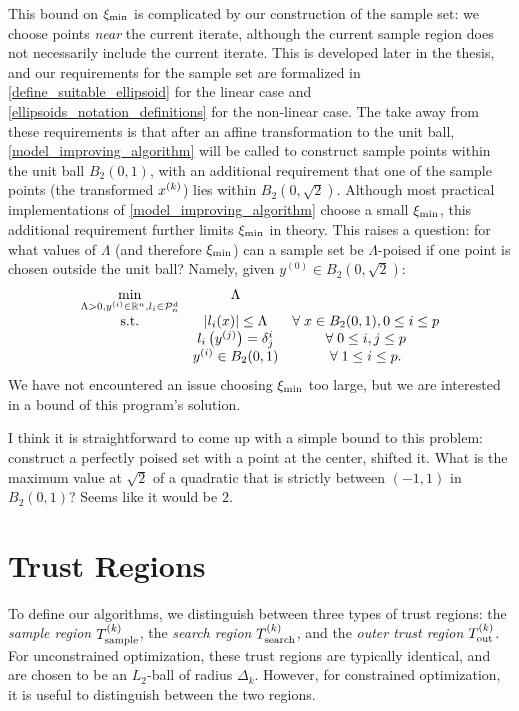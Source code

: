 This bound on $\xi_{\text{min}}$ is complicated by our construction of the sample set:
we choose points {\em near} the current iterate, although the current sample region does not necessarily include the current iterate.
This is developed later in the thesis, and our requirements for the sample set are formalized in \cref{define_suitable_ellipsoid} for the linear case and \cref{ellipsoids_notation_definitions} for the non-linear case.
The take away from these requirements is that after an affine transformation to the unit ball, \cref{model_improving_algorithm} 
will be called to construct sample points within the unit ball $B_2(0, 1)$, with an additional requirement that one of the sample points (the transformed $x^{(k)}$)
 lies within $B_2\left(0, \sqrt{2}\right)$.
Although most practical implementations of \cref{model_improving_algorithm} choose a small $\xi_{\text{min}}$, 
this additional requirement further limits $\xi_{\text{min}}$ in theory.
This raises a question:
for what values of $\Lambda$ (and therefore $\xi_{\text{min}}$) can a sample set be $\Lambda$-poised if one point is chosen outside the unit ball?
Namely, given $y^{(0)} \in B_2\left(0, \sqrt{2}\right)$:
\begin{align*}
\begin{array}{ccc}
\min\limits_{\Lambda>0, y^{(i)}\in\mathbb R^n, l_i\in\mathcal{P}^d_n} & \Lambda & \\
\textrm{s.t.} & |l_i(x)| \le \Lambda & \forall \; x \in B_2(0, 1), 0 \le i \le p \\
& l_i\left(y^{(j)}\right) = \delta^i_j & \forall \; 0 \le i,j \le p \\
& y^{(i)} \in B_2(0, 1) & \forall \; 1 \le i \le p.
\end{array}
\end{align*}
We have not encountered an issue choosing $\xi_{\text{min}}$ too large,
but we are interested in a bound of this program's solution.

\begin{boxedcomment}
I think it is straightforward to come up with a simple bound to this problem:
construct a perfectly poised set with a point at the center, shifted it.
What is the maximum value at $\sqrt 2$ of a quadratic that is strictly between $(-1, 1)$ in $B_2(0, 1)$?
Seems like it would be $2$.
\end{boxedcomment}

\section{Trust Regions}

To define our algorithms, we distinguish between three types of trust regions: 
the {\em sample region} ${T_{\text{sample}}^{(k)}}$,
the {\em search region} ${T_{\text{search}}^{(k)}}$,
and the {\em outer trust region} ${T_{\text{out}}^{(k)}}$.
For unconstrained optimization,  these trust regions are typically identical,  and are chosen to be an $L_2$-ball of radius $\Delta_k$.
However, for constrained optimization, it is useful to distinguish between the two regions.



